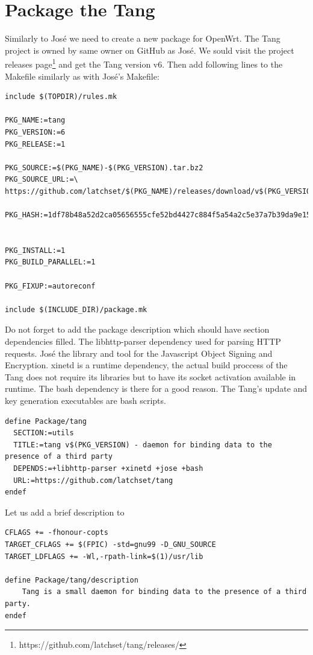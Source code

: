 \section{Package the Tang}
Similarly to José we need to create a new package for OpenWrt.
The Tang project is owned by same owner on GitHub as José.
We sould visit the project releases page\footnote{https://github.com/latchset/tang/releases/} and get the Tang version v6.
Then add following lines to the Makefile similarly as with José's Makefile:
\begin{lstlisting}[columns=fixed,basicstyle=\ttfamily\footnotesize,tabsize=4,backgroundcolor=\color{yellow!10}]
include $(TOPDIR)/rules.mk

PKG_NAME:=tang
PKG_VERSION:=6
PKG_RELEASE:=1

PKG_SOURCE:=$(PKG_NAME)-$(PKG_VERSION).tar.bz2
PKG_SOURCE_URL:=\
https://github.com/latchset/$(PKG_NAME)/releases/download/v$(PKG_VERSION)/

PKG_HASH:=1df78b48a52d2ca05656555cfe52bd4427c884f5a54a2c5e37a7b39da9e155e3


PKG_INSTALL:=1
PKG_BUILD_PARALLEL:=1

PKG_FIXUP:=autoreconf

include $(INCLUDE_DIR)/package.mk
\end{lstlisting}
Do not forget to add the package description which should have section dependencies filled.
The libhttp-parser dependency used for parsing HTTP requests.
José the library and tool for the Javascript Object Signing and Encryption.
xinetd is a runtime dependency, the actual build proccess of the Tang does not require its libraries but to have its socket activation available in runtime.
The bash dependency is there for a good reason.
The Tang's update and key generation executables are bash scripts.
\begin{lstlisting}[columns=fixed,basicstyle=\ttfamily\footnotesize,tabsize=4,backgroundcolor=\color{yellow!10}]
define Package/tang
  SECTION:=utils
  TITLE:=tang v$(PKG_VERSION) - daemon for binding data to the presence of a third party
  DEPENDS:=+libhttp-parser +xinetd +jose +bash
  URL:=https://github.com/latchset/tang
endef
\end{lstlisting}
Let us add a brief description to
\begin{lstlisting}[columns=fixed,basicstyle=\ttfamily\footnotesize,tabsize=4,backgroundcolor=\color{yellow!10}]
CFLAGS += -fhonour-copts
TARGET_CFLAGS += $(FPIC) -std=gnu99 -D_GNU_SOURCE
TARGET_LDFLAGS += -Wl,-rpath-link=$(1)/usr/lib

define Package/tang/description
	Tang is a small daemon for binding data to the presence of a third party.
endef
\end{lstlisting}


